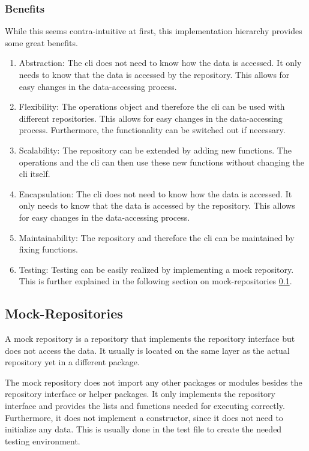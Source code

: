 \subsubsection*{Benefits}
While this seems contra-intuitive at first, this implementation hierarchy provides some great benefits.
\begin{enumerate}
    \item Abstraction: The cli does not need to know how the data is accessed.
          It only needs to know that the data is accessed by the repository.
          This allows for easy changes in the data-accessing process.
    \item Flexibility: The operations object and therefore the cli can be used with different repositories.
          This allows for easy changes in the data-accessing process.
          Furthermore, the functionality can be switched out if necessary.
    \item Scalability: The repository can be extended by adding new functions.
          The operations and the cli can then use these new functions without changing the cli itself.
    \item Encapsulation: The cli does not need to know how the data is accessed.
          It only needs to know that the data is accessed by the repository.
          This allows for easy changes in the data-accessing process.
    \item Maintainability: The repository and therefore the cli can be maintained by fixing functions.
    \item Testing: Testing can be easily realized by implementing a mock repository.
          This is further explained in the following section on mock-repositories \ref*{sec:mock_repositories}.
\end{enumerate}

\subsection{Mock-Repositories}
\label{sec:mock_repositories}
A mock repository is a repository that implements the repository interface but does not access the data.
It usually is located on the same layer as the actual repository yet in a different package.

The mock repository does not import any other packages or modules besides the repository interface or helper packages.
It only implements the repository interface and provides the lists and functions needed for executing correctly.
Furthermore, it does not implement a constructor, since it does not need to initialize any data.
This is usually done in the test file to create the needed testing environment.

